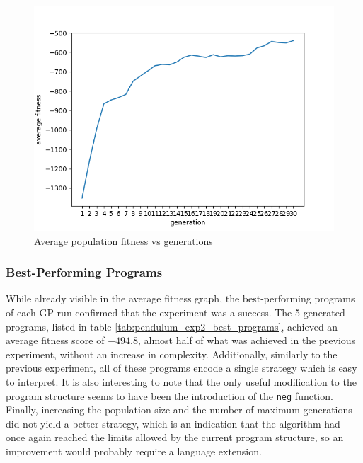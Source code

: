 \begin{figure}[ht]
    \centering
    \includegraphics[width=12cm]{images/pendulum_deep_simple_GP.png}
    \caption{Average population fitness vs generations}
    \label{fig:pendulum_exp2_plot}
\end{figure}

\subsubsection{Best-Performing Programs}
While already visible in the average fitness graph, the best-performing programs of each GP run confirmed that the experiment was a success. The 5 generated programs, listed in table \ref{tab:pendulum_exp2_best_programs}, achieved an average fitness score of $-494.8$, almost half of what was achieved in the previous experiment, without an increase in complexity. Additionally, similarly to the previous experiment, all of these programs encode a single strategy which is easy to interpret. It is also interesting to note that the only useful modification to the program structure seems to have been the introduction of the \verb+neg+ function. Finally, increasing the population size and the number of maximum generations did not yield a better strategy, which is an indication that the algorithm had once again reached the limits allowed by the current program structure, so an improvement would probably require a language extension.

